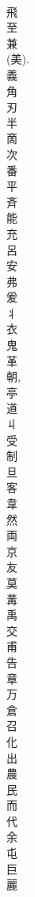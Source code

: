 \documentclass[8pt]{extreport}
\begin{document}
\begin{CJK}{UTF8}{min}
\\	飛	
\\	至	
\\	兼	
\\	(美). 
\\	義	
\\	角	
\\	刃	
\\	半	
\\	啇	
\\	次	
\\	番	
\\	平	
\\	斉	
\\	能	
\\	充	
\\	呂	
\\	安	
\\	弗	
\\	爰	
\\	丬	
\\	衣	
\\	鬼	
\\	革	
\\	朝, 
\\	亭	
\\	道	
\\	丩	
\\	受	
\\	制	
\\	旦	
\\	客	
\\	韋	
\\	然	
\\	両	
\\	京	
\\	友	
\\	莫	
\\	冓	
\\	禹	
\\	交	
\\	甫	
\\	告	
\\	章	
\\	万	
\\	倉	
\\	召	
\\	化	
\\	出	
\\	農	
\\	民	
\\	而	
\\	代	
\\	余	
\\	屯	
\\	巨	
\\	麗	

\end{CJK}
\end{document}
